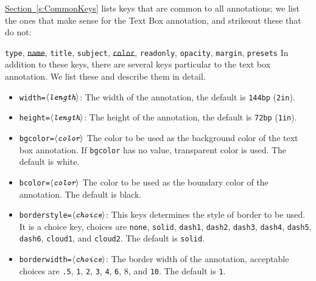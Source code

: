 \documentclass[12pt]{article}
\makeatletter
\let\opt\texttt
\let\uif\textsf
\def\ameta#1{$\langle\textit{\texttt{#1}}\rangle$}
\renewenvironment{quote}[1][]
   {\def\@rgi{#1}\ifx\@rgi\@empty
    \let\rghtm\@empty\else\def\rghtm{\rightmargin\leftmargin}\fi
    \list{}{\rghtm} %
    \item\relax}
   {\endlist}
\makeatother
\begin{document}
\hyperref[s:CommonKeys]{Section~\ref*{s:CommonKeys}} lists keys that are
common to all annotations; we list the ones that make sense for the \uif{Text
Box} annotation, and strikeout these that do not:
\begin{quote}\raggedright
\texttt{type}, \texttt{\st{name}}, \texttt{title}, \texttt{subject},
\texttt{\st{color}}, \texttt{readonly}, \texttt{opacity}, \texttt{margin},
\texttt{presets}
\end{quote}
In addition to these keys,  there are several keys particular to the text box
annotation. We list these and describe them in detail.
\begin{itemize}
    \item \texttt{width=\ameta{length}}: The width of the annotation, the
        default is \texttt{144bp} (\texttt{2in}).
    \item \texttt{height=\ameta{length}}: The height of the annotation, the
        default is \texttt{72bp} (\texttt{1in}).
    \item \texttt{bgcolor=\ameta{color}} The color to be used as the background color
    of the text box annotation. If \opt{bgcolor} has no value, transparent color is used.
    The default is white.
    \item \texttt{bcolor=\ameta{color}} The color to be used as the boundary color of the
    annotation. The default is black.
    \item \texttt{borderstyle=\ameta{choice}}: This keys determines the
        style of border to be used. It is a choice key, choices are
        \texttt{none}, \texttt{solid}, \texttt{dash1}, \texttt{dash2},
        \texttt{dash3}, \texttt{dash4}, \texttt{dash5}, \texttt{dash6},
        \texttt{cloud1}, and \texttt{cloud2}. The default is  \texttt{solid}.
    \item \texttt{borderwidth=\ameta{choice}}: The border width of the
        annotation, acceptable choices are  \texttt{.5}, \texttt{1}, \texttt{2},
        \texttt{3}, \texttt{4}, \texttt{6}, 8, and \texttt{10}. The default is \texttt{1}.
\end{itemize}
\begin{textboxpara}
\end{textboxpara}%
\end{document}
